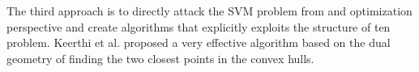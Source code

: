 The third approach is to directly attack the SVM problem from and optimization perspective and create algorithms that explicitly exploits the structure of ten problem. Keerthi et al. \cite{fastSVM6} proposed a very effective algorithm based on the dual geometry of finding the two closest points in the convex hulls. 
 

%
 

